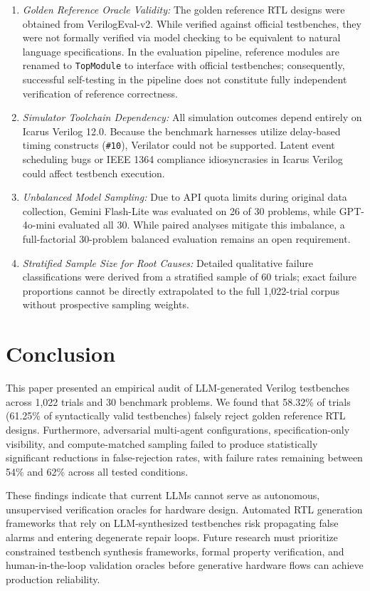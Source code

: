 \documentclass[conference]{IEEEtran}
\begin{document}
\begin{enumerate}
    \item \textit{Golden Reference Oracle Validity:} The golden reference RTL designs were obtained from VerilogEval-v2. While verified against official testbenches, they were not formally verified via model checking to be equivalent to natural language specifications. In the evaluation pipeline, reference modules are renamed to \texttt{TopModule} to interface with official testbenches; consequently, successful self-testing in the pipeline does not constitute fully independent verification of reference correctness.
    \item \textit{Simulator Toolchain Dependency:} All simulation outcomes depend entirely on Icarus Verilog 12.0. Because the benchmark harnesses utilize delay-based timing constructs (\texttt{\#10}), Verilator could not be supported. Latent event scheduling bugs or IEEE 1364 compliance idiosyncrasies in Icarus Verilog could affect testbench execution.
    \item \textit{Unbalanced Model Sampling:} Due to API quota limits during original data collection, Gemini Flash-Lite was evaluated on 26 of 30 problems, while GPT-4o-mini evaluated all 30. While paired analyses mitigate this imbalance, a full-factorial 30-problem balanced evaluation remains an open requirement.
    \item \textit{Stratified Sample Size for Root Causes:} Detailed qualitative failure classifications were derived from a stratified sample of 60 trials; exact failure proportions cannot be directly extrapolated to the full 1,022-trial corpus without prospective sampling weights.
\end{enumerate}

\section{Conclusion}
This paper presented an empirical audit of LLM-generated Verilog testbenches across 1,022 trials and 30 benchmark problems. We found that 58.32\% of trials (61.25\% of syntactically valid testbenches) falsely reject golden reference RTL designs. Furthermore, adversarial multi-agent configurations, specification-only visibility, and compute-matched sampling failed to produce statistically significant reductions in false-rejection rates, with failure rates remaining between 54\% and 62\% across all tested conditions. 

These findings indicate that current LLMs cannot serve as autonomous, unsupervised verification oracles for hardware design. Automated RTL generation frameworks that rely on LLM-synthesized testbenches risk propagating false alarms and entering degenerate repair loops. Future research must prioritize constrained testbench synthesis frameworks, formal property verification, and human-in-the-loop validation oracles before generative hardware flows can achieve production reliability.



\end{document}
